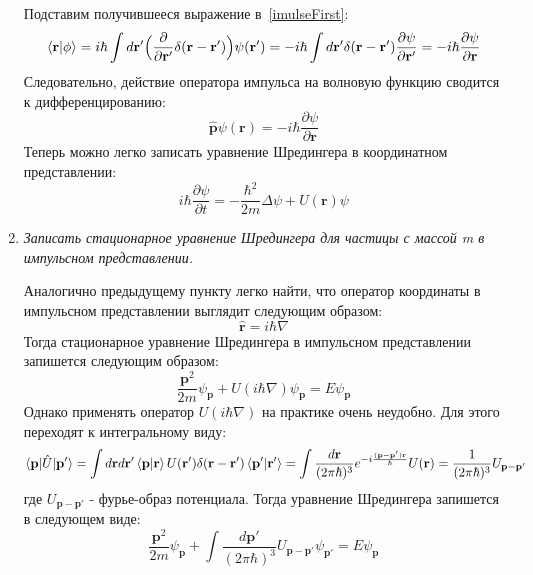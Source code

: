 \documentclass{article}
\begin{document}
\begin{enumerate}
	Подставим получившееся выражение в~\eqref{imulseFirst}:
	\begin{equation}
		\braket{\textbf{r}|\phi} = i\hbar \int d\textbf{r}' \Big(\frac{\partial}{\partial \textbf{r}'} \delta(\textbf{r} - \textbf{r}')\Big) \psi(\textbf{r}') = - i\hbar \int d\textbf{r}' \delta(\textbf{r} - \textbf{r}') \frac{\partial \psi}{\partial \textbf{r}'} = - i\hbar \frac{\partial \psi}{\partial \textbf{r}}
	\end{equation}
	Следовательно, действие оператора импульса на волновую функцию сводится к дифференцированию:
	\begin{equation}
		\hat{\textbf{p}}\psi(\textbf{r}) = -i\hbar \frac{\partial \psi}{\partial \textbf{r}}
	\end{equation}
	Теперь можно легко записать уравнение Шредингера в координатном представлении:
	\begin{equation}
		i\hbar \frac{\partial \psi}{\partial t} = -\frac{\hbar^2}{2m} \Delta \psi + U(\textbf{r})\psi
	\end{equation}
	
	\item \textit{Записать стационарное уравнение Шредингера для частицы с массой m в импульсном представлении.}
	
	Аналогично предыдущему пункту легко найти, что оператор координаты в импульсном представлении выглядит следующим образом:
	\begin{equation}
		\hat{\textbf{r}} = i\hbar \nabla
	\end{equation}
	Тогда стационарное уравнение Шредингера в импульсном представлении запишется следующим образом:
	\begin{equation}
		\frac{\textbf{p}^2}{2m} \psi_\textbf{p} + U(i\hbar\nabla)\psi_\textbf{p} = E \psi_\textbf{p}
	\end{equation}
	Однако применять оператор $U(i\hbar\nabla)$ на практике очень неудобно. Для этого переходят к интегральному виду:
	\begin{equation}
		\braket{\textbf{p}|\hat{U}|\textbf{p}'} = \int d\textbf{r} d\textbf{r}' \braket{\textbf{p}|\textbf{r}} U(\textbf{r}')\delta(\textbf{r}-\textbf{r}')\braket{\textbf{p}'|\textbf{r}'} = \int \frac{d\textbf{r}}{(2\pi\hbar)^3} e^{-i\frac{(\textbf{p}-\textbf{p}')\textbf{r}}{\hbar}} U(\textbf{r}) = \frac{1}{(2\pi\hbar)^3}U_{\textbf{p}-\textbf{p}'}
	\end{equation}
	где $U_{\textbf{p}-\textbf{p}'}$ - фурье-образ потенциала. Тогда уравнение Шредингера запишется в следующем виде:
	\begin{equation}
		\frac{\textbf{p}^2}{2m} \psi_\textbf{p} + \int \frac{d\textbf{p}'}{(2\pi\hbar)^3} U_{\textbf{p}-\textbf{p}'}\psi_{\textbf{p}'} = E \psi_\textbf{p}
	\end{equation}
\end{enumerate}
\end{document}
